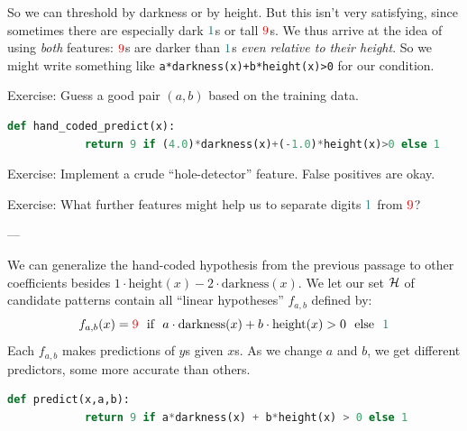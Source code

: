 \documentclass[11pt, justified]{tufte-book}
\newcommand{\attn}[1]{{\bro \textsf{#1}}}
\newcommand{\blarr}{\hspace{-0.15cm}${\bro \leftarrow}\,$}
\newcommand{\bcirc}{${\bro ^\circ}$}
\newcommand{\plainfootprint}{}
\newcommand{\footprint}{\marginnote{\plainfootprint} }
\newcommand{\sampassage}[1]{
   \vspace{0.1cm}
   \par\noindent{\hspace{-2cm}\normalsize \sc \gre #1} ---
}
\theoremstyle{definition}
\begin{document}
        So we can threshold by darkness or by height.  But this isn't very
        satisfying, since sometimes there are especially dark ${\cya{1}}$s or
        tall ${\red{9}}$s. 
        We thus arrive at the idea of using \emph{both} features: ${\red{9}}$s
        are darker than ${\cya{1}}$s \emph{even relative to their
        height}.  So we might write something like
        \texttt{a*darkness(x)+b*height(x)>0} for
        our condition.
        \par\noindent
        \attn{Exercise:} {Guess a good pair $(a,b)$ based on the training data.}
        \begin{lstlisting}[language=Python, basicstyle=\footnotesize\ttfamily]
          def hand_coded_predict(x):
            return 9 if (4.0)*darkness(x)+(-1.0)*height(x)>0 else 1
        \end{lstlisting}
        \par\noindent
        \attn{Exercise:} {Implement a crude ``hole-detector'' feature.  False
        positives are okay.}
        \par\noindent
        \attn{Exercise:} {What further features might help us to separate digits
        ${\cya{1}}$ from ${\red{9}}$?}\footprint


    \newpage
      \sampassage{candidate patterns}
        We can generalize the hand-coded hypothesis from the previous passage
        to other coefficients besides $1\cdot \text{height}(x) -
        2\cdot\text{darkness}(x)$.  We let our set $\mathcal{H}$ of candidate patterns
        contain all ``linear hypotheses'' $f_{a,b}$ defined by:\footprint
        $$
          f_{a,b}(x) = {\red{9}} \text{~~if~~} a\cdot\text{darkness}(x) + b\cdot\text{height}(x) > 0 \text{~~else~~} {\cya{1}}
        $$ 
        Each $f_{a,b}$ makes predictions of $y$s given $x$s.  As we change $a$
        and $b$, we get different predictors, some more accurate than others.

        \begin{lstlisting}[language=Python, basicstyle=\footnotesize\ttfamily]
          def predict(x,a,b):
            return 9 if a*darkness(x) + b*height(x) > 0 else 1
        \end{lstlisting}
\end{document}
